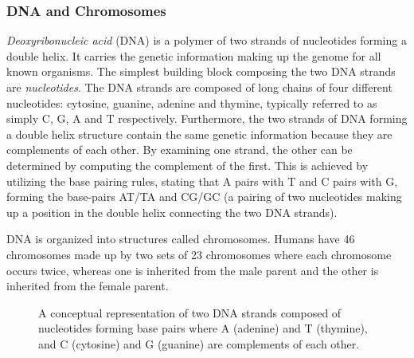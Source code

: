 \subsubsection{DNA and Chromosomes} \label{background:biology:dna_and_chromosomes}
\textit{Deoxyribonucleic acid} (DNA) is a polymer of two strands of nucleotides forming a double helix. 
It carries the genetic information making up the genome for all known organisms. 
The simplest building block composing the two DNA strands are \textit{nucleotides}.
The DNA strands are composed of long chains of four different nucleotides: cytosine, guanine, adenine and thymine, typically referred to as simply C, G, A and T respectively.
Furthermore, the two strands of DNA forming a double helix structure contain the same genetic information because they are complements of each other.
By examining one strand, the other can be determined by computing the complement of the first.
This is achieved by utilizing the base pairing rules, stating that A pairs with T and C pairs with G, forming the base-pairs AT/TA and CG/GC (a pairing of two nucleotides making up a position in the double helix connecting the two DNA strands).

DNA is organized into structures called chromosomes. 
Humans have 46 chromosomes made up by two sets of 23 chromosomes where each chromosome occurs twice, whereas one is inherited from the male parent and the other is inherited from the female parent.

\begin{figure}[ht!]
\begin{center}
\caption{A conceptual representation of two DNA strands composed of nucleotides forming base pairs where A (adenine) and T (thymine), and C (cytosine) and G (guanine) are complements of each other.}
\label{background:biology:dna_and_chromosomes:figures:dna_strands}
\end{center}
\end{figure}
